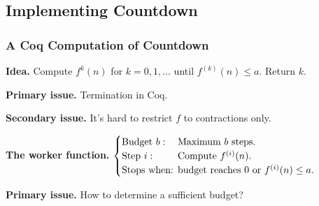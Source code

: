 \subsection{Implementing Countdown}

\begin{frame}[fragile]
\frametitle{A Coq Computation of Countdown}
\textbf{Idea.} %
Compute $f^{k}(n)$ for $k=0, 1,\ldots$ until $f^{(k)}(n)\le a$. Return $k$.

\bigskip

\pause 
\textbf{Primary issue.} Termination in Coq.

\bigskip

\textbf{Secondary issue.} It's hard to restrict $f$ to contractions only.

\bigskip

\pause 
\textbf{The worker function.} $\begin{cases}
\text{Budget } b: & \hspace{-1em}\text{Maximum } b \text{ steps. } \\
\text{Step } i: & \hspace{-1em}\text{Compute } f^{(i)}(n). \\
\text{Stops when: } & \hspace{-1em}\text{budget reaches } 0 \text{ or } f^{(i)}(n) \le a.
\end{cases}$


\bigskip

\pause 
\textbf{Primary issue.} How to determine a sufficient budget?
\end{frame}


